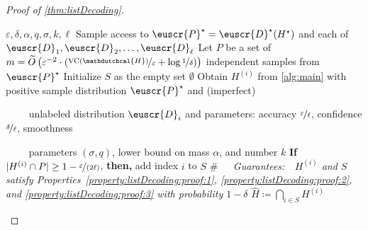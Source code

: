 \documentclass[11pt]{article}
\theoremstyle{plain}
\theoremstyle{definition}
\theoremstyle{remark}
\def\sabs#1{| #1 |}
\newcommand{\inparen}[1]{\left(#1\right)}
\newcommand{\nfrac}[2]{\nicefrac{#1}{#2}}
\newcommand{\vc}{\textrm{\rm VC}}
\newcommand{\eps}{\varepsilon}
\newcommand{\wh}[1]{\widehat{#1}}
\newcommand{\wt}[1]{\widetilde{#1}}
\newcommand{\customcal}[1]{\euscr{#1}}
\newcommand{\cD}{\customcal{D}}
\newcommand{\cP}{\customcal{P}}
\newcommand{\hypo}[1]{\mathdutchcal{#1}}
\newcommand{\hyH}{\hypo{H}}
\newcommand{\optset}{{H^\star}}
\newcommand{\cDtrue}{\cD^\star}
\newcommand{\cDgiven}{\cD}
\newcommand{\cPtrue}{\cP^\star}
\begin{document}
\begin{proof}[Proof of \cref{thm:listDecoding}]
            \begin{algorithm}[ht!]
            \caption{Efficient Algorithm to Learn from Positive Samples and List of Unlabeled Samples}\label{alg:listDecoding}
            \begin{algorithmic}
                \Require $\eps, \delta,  \alpha , q, \sigma, k, \ell$ %
                \Ensure Sample access to $\cPtrue=\cDtrue(\optset)$ and each of $\cD_1,\cD_2,\dots,\cD_\ell$
                \State Let $P$ be a set of $m=\wt{O}\inparen{\eps^{-2}\cdot \inparen{\nfrac{\vc(\hyH)}{\eps} + \log{\nfrac{1}{\delta}}}}$ independent samples from $\cPtrue$
                \State Initialize $S$ as the empty set $\emptyset$
                    \State Obtain $H^{(i)}$ from \cref{alg:main} with positive sample distribution $\cPtrue$ and (imperfect) 
                    \item[] \phantom{.}~~~~ unlabeled distribution $\cDgiven_i$ and parameters: accuracy $\nfrac{\eps}{\ell}$, confidence $\nfrac{\delta}{\ell}$, smoothness 
                    \item[] \phantom{.}~~~~  parameters $(\sigma,q)$, lower bound on mass $\alpha$, and number $k$
                    \vspace{2mm}
                    \State \textbf{If} $\sabs{H^{(i)}\cap P}\geq 1-\nfrac{\eps}{(2\ell)}$, \textbf{then,} add index $i$ to $S$
                    \State \textit{$\#$~~~Guarantees:~~$H^{(i)}$ and $S$ satisfy Properties~\ref{property:listDecoding:proof:1}, \ref{property:listDecoding:proof:2}, and \ref{property:listDecoding:proof:3} with probability $1-\delta$} 
                \EndFor
                \State \Return $\wh{H}\coloneqq \bigcap_{i\in S} H^{(i)}$
            \end{algorithmic}
            \end{algorithm}
 


\end{proof}
\end{document}

